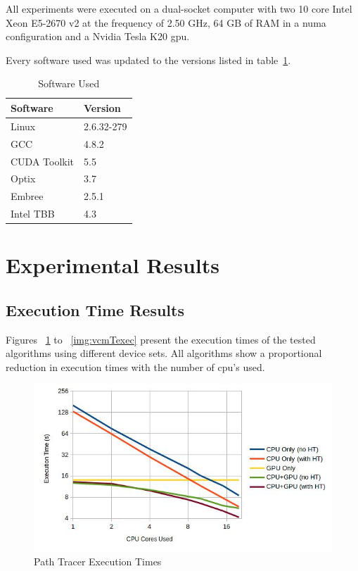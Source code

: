 
All experiments were executed on a dual-socket computer with two 10 core Intel Xeon E5-2670 v2 at the frequency of 2.50 GHz, 64 GB of RAM in a \gls{numa} configuration and a Nvidia Tesla K20 \gls{gpu}.

Every software used was updated to the versions listed in table~\ref{tab:soft_ver}.

\begin{table}[h]
\centering
\begin{tabular}{|l|l|}

\hline
Software & Version \\
\hline
Linux & 2.6.32-279 \\
\hline
GCC & 4.8.2 \\
\hline
CUDA Toolkit & 5.5 \\
\hline
Optix & 3.7 \\
\hline
Embree & 2.5.1 \\
\hline
Intel TBB & 4.3 \\
\hline
\end{tabular}
\caption{\label{tab:soft_ver} Software Used}
\end{table}

\section{Experimental Results}

\subsection{\label{sec:texec}Execution Time Results}

Figures ~\ref{img:ptTexec} to ~\ref{img:vcmTexec} present the execution times of the tested algorithms using different device sets. All algorithms show a proportional reduction in execution times with the number of \gls{cpu}'s used.

\begin{figure}[H]
\centering
\includegraphics[width=0.8\linewidth]{img/ptTexec.jpg}
\caption{\label{img:ptTexec} Path Tracer Execution Times}
\end{figure}

